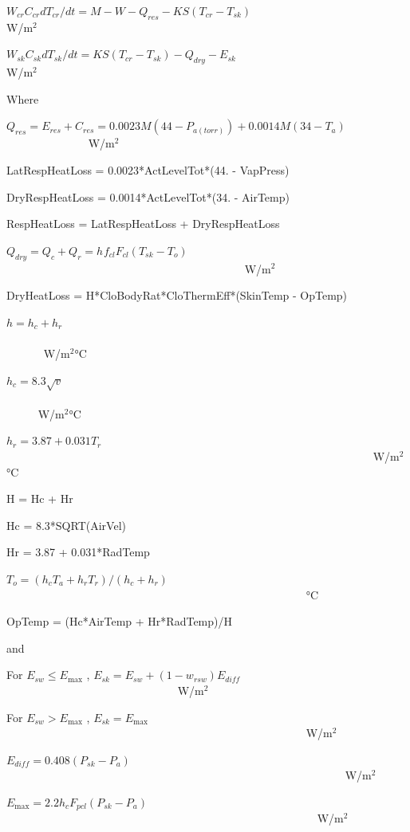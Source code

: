 \({W_{cr}}{C_{cr}}d{T_{cr}}/dt = M - W - {Q_{res}} - KS({T_{cr}} - {T_{sk}})\) ~~~~~~~~~~~~~~~~~~~~~~~~ W/m\(^{2}\)

\({W_{sk}}{C_{sk}}d{T_{sk}}/dt = KS({T_{cr}} - {T_{sk}}) - {Q_{dry}} - {E_{sk}}\) ~~~~~~~~~~~~~~~~~~~~~~~~~~~~~~ W/m\(^{2}\)

Where

\({Q_{res}} = {E_{res}} + {C_{res}} = 0.0023M(44 - {P_{a(torr)}}) + 0.0014M(34 - {T_a})\) ~~~~~~~~~~~~~~ W/m\(^{2}\)

LatRespHeatLoss = 0.0023*ActLevelTot*(44. - VapPress)

DryRespHeatLoss = 0.0014*ActLevelTot*(34. - AirTemp)

RespHeatLoss = LatRespHeatLoss + DryRespHeatLoss

\({Q_{dry}} = {Q_c} + {Q_r} = {h_{}}{f_{cl}}{F_{cl}}({T_{sk}} - {T_o})\) ~~~~~~~~~~~~~~~~~~~~~~~~~~~~~~~~~~~~~~~~~~ W/m\(^{2}\)

DryHeatLoss = H*CloBodyRat*CloThermEff*(SkinTemp - OpTemp)

\(h = {h_c} + {h_r}\) ~~~~~~~~~~~~~~~~~~~~~~~~~~~~~~~~~~~~~~~~~~~~~~~~~~~~~~~~~~~~~~~~~~~~~~~~~~~~~~ W/m\(^{2}\)°C

\({h_c} = 8.3\sqrt v\) ~~~~~~~~~~~~~~~~~~~~~~~~~~~~~~~~~~~~~~~~~~~~~~~~~~~~~~~~~~~~~~~~~~~~~~~~~~~~~ W/m\(^{2}\)°C

\({h_r} = 3.87 + 0.031{T_r}\) ~~~~~~~~~~~~~~~~~~~~~~~~~~~~~~~~~~~~~~~~~~~~~~~~~~~~~~~~~~~~~~~~~ W/m\(^{2}\)°C

H = Hc + Hr

Hc = 8.3*SQRT(AirVel)

Hr = 3.87 + 0.031*RadTemp

\({T_o} = ({h_c}{T_a} + {h_r}{T_r})/({h_c} + {h_r})\) ~~~~~~~~~~~~~~~~~~~~~~~~~~~~~~~~~~~~~~~~~~~~~~~~~~~~~ °C

OpTemp = (Hc*AirTemp + Hr*RadTemp)/H

and

For \({E_{sw}} \le {E_{\max }}\) , \({E_{sk}} = {E_{sw}} + (1 - {w_{rsw}}){E_{diff}}\) ~~~~~~~~~~~~~~~~~~~~~~~~~~~~~~ W/m\(^{2}\)

For \({E_{sw}} > {E_{\max }}\) , \({E_{sk}} = {E_{\max }}\) ~~~~~~~~~~~~~~~~~~~~~~~~~~~~~~~~~~~~~~~~~~~~~~~~~~~~~ W/m\(^{2}\)

\({E_{diff}} = 0.408({P_{sk}} - {P_a})\) ~~~~~~~~~~~~~~~~~~~~~~~~~~~~~~~~~~~~~~~~~~~~~~~~~~~~~~~~~~~~ W/m\(^{2}\)

\({E_{\max }} = 2.2{h_c}{F_{pcl}}({P_{sk}} - {P_a})\) ~~~~~~~~~~~~~~~~~~~~~~~~~~~~~~~~~~~~~~~~~~~~~~~~~~~~~~~ W/m\(^{2}\)

